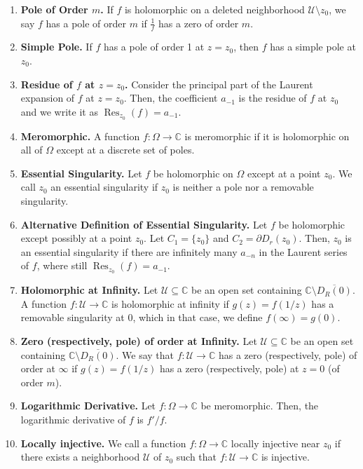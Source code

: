 \documentclass[11pt]{article}
\theoremstyle{definition}
\theoremstyle{named}
\DeclareMathOperator{\Res}{Res}
\begin{document}
\begin{enumerate}
    \item \textbf{Pole of Order $m$. } If $f$ is holomorphic on a deleted neighborhood $\mathcal{U} \setminus {z_0}$, we say $f$ has a pole of order $m$ if $\frac{1}{f}$ has a zero of order $m$. 
    \item \textbf{Simple Pole. } If $f$ has a pole of order 1 at $z=z_0$, then $f$ has a simple pole at $z_0$. 
    \item \textbf{Residue of $f$ at $z=z_0$. } Consider the principal part of the Laurent expansion of $f$ at $z=z_0$. Then, the coefficient $a_{-1}$ is the residue of $f$ at $z_0$ and we write it as $\Res_{z_0}(f) = a_{-1}$. 
    \item \textbf{Meromorphic. } A function $f: \Omega \to \mathbb{C}$ is meromorphic if it is holomorphic on all of $\Omega$ except at a discrete set of poles. 
    \item \textbf{Essential Singularity. } Let $f$ be holomorphic on $\Omega$ except at a point $z_0$. We call $z_0$ an essential singularity if $z_0$ is neither a pole nor a removable singularity. 
    \item \textbf{Alternative Definition of Essential Singularity. } Let $f$ be holomorphic except possibly at a point $z_0$. Let $C_1 = \{z_0\}$ and $C_2 = \partial D_r(z_0)$. Then, $z_0$ is an essential singularity if there are infinitely many $a_{-n}$ in the Laurent series of $f$, where still $\Res_{z_0}(f) = a_{-1}$. 
    \item \textbf{Holomorphic at Infinity. } Let $\mathcal{U} \subseteq \mathbb{C}$ be an open set containing $\mathbb{C} \setminus \overline{D_R(0)}$. A function $f: \mathcal{U} \to \mathbb{C}$ is holomorphic at infinity if $g(z) = f(1/z)$ has a removable singularity at 0, which in that case, we define $f(\infty) = g(0)$. 
    \item \textbf{Zero (respectively, pole) of order at Infinity. } Let $\mathcal{U} \subseteq \mathbb{C}$ be an open set containing $\mathbb{C} \setminus \overline{D_R(0)}$. We say that $f: \mathcal{U} \to \mathbb{C}$ has a zero (respectively, pole) of order at $\infty$ if $g(z) = f(1/z)$ has a zero (respectively, pole) at $z=0$ (of order $m$). 
    \item \textbf{Logarithmic Derivative. } Let $f: \Omega \to \mathbb{C}$ be meromorphic. Then, the logarithmic derivative of $f$ is $f'/f$. 
    \item \textbf{Locally injective. } We call a function $f: \Omega \to \mathbb{C}$ locally injective near $z_0$ if there exists a neighborhood $\mathcal{U}$ of $z_0$ such that $f: \mathcal{U} \to \mathbb{C}$ is injective. 

\end{enumerate}
\end{document}
